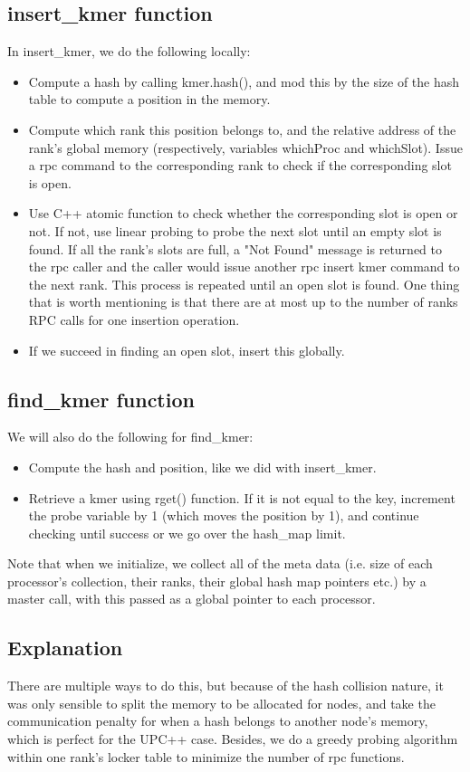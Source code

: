 \documentclass[12pt]{article}
\begin{document}
\subsection{insert\_kmer function}
In insert\_kmer, we do the following locally: 
\begin{itemize}
\item Compute a hash by calling kmer.hash(), and mod this by the size of the hash table to compute a position in the memory.
\item Compute which rank this position belongs to, and the relative address of the rank's global memory (respectively, variables whichProc and whichSlot). Issue a rpc command to the corresponding rank to check if the corresponding slot is open.
\item Use C++ atomic function to check whether the corresponding slot is open or not. If not, use linear probing to probe the next slot until an empty slot is found. If all the rank's slots are full, a "Not Found" message is returned to the rpc caller and the caller would issue another rpc insert kmer command to the next rank. This process is repeated until an open slot is found. One thing that is worth mentioning is that there are at most up to the number of ranks RPC calls for one insertion operation.
\item If we succeed in finding an open slot, insert this globally. 
\end{itemize}
\subsection{find\_kmer function}
We will also do the following for find\_kmer: 
\begin{itemize}
\item Compute the hash and position, like we did with insert\_kmer. 
\item Retrieve a kmer using rget() function. If it is not equal to the key, increment the probe variable by 1 (which moves the position by 1), and continue checking until success or we go over the hash\_map limit. 
\end{itemize}
Note that when we initialize, we collect all of the meta data (i.e. size of each processor's collection, their ranks, their global hash map pointers etc.) by a master call, with this passed as a global pointer to each processor. 


\subsection{Explanation}
There are multiple ways to do this, but because of the hash collision nature, it was only sensible to split the memory to be allocated for nodes, and take the communication penalty for when a hash belongs to another node's memory, which is perfect for the UPC++ case. Besides, we do a greedy probing algorithm within one rank's locker table to minimize the number of rpc functions. 
\end{document}
